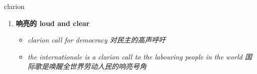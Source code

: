 
\begin{frame}
{\huge clarion}
\begin{center}
\begin{enumerate}\Large
  \item \textbf{响亮的 loud and clear}
  \begin{itemize}
    \item \em{\Large{clarion call for democracy 对民主的高声呼吁}}
    \item \em{\Large{the internationale is a clarion call to the labouring people in the world 国际歌是唤醒全世界劳动人民的响亮号角}}
  \end{itemize}
\end{enumerate}
\end{center}
\end{frame}
